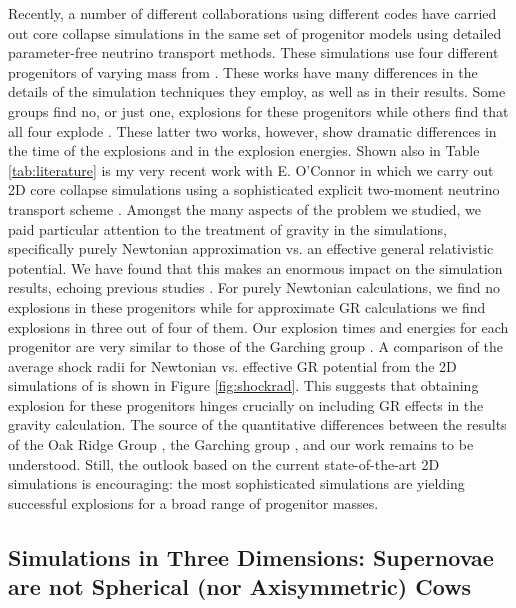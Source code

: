 Recently, a number of different collaborations using different codes have carried out core collapse simulations in the same set of progenitor models using detailed parameter-free neutrino transport methods.
These simulations use four different progenitors of varying mass from \citet{Woosley:2007d}.
These works have many differences in the details of the simulation techniques they employ, as well as in their results.
Some groups find no, or just one, explosions for these progenitors \citep{Suwa:2014, Dolence:2015} while others find that all four explode \citep{Bruenn:2013, Hanke:2014}.
These latter two works, however, show dramatic differences in the time of the explosions and in the explosion energies.
Shown also in Table \ref{tab:literature} is my very recent work with E. O'Connor in which we carry out 2D core collapse simulations using a sophisticated explicit two-moment neutrino transport scheme \citep[``M1'';][]{OConnor:2015a}.
Amongst the many aspects of the problem we studied, we paid particular attention to the treatment of gravity in the simulations, specifically purely Newtonian approximation vs. an effective general relativistic potential.
We have found that this makes an enormous impact on the simulation results, echoing previous studies \citep{Liebendorfer:2001, Rampp:2002, Muller:2012a, Lentz:2012}.
For purely Newtonian calculations, we find no explosions in these progenitors while for approximate GR calculations we find explosions in three out of four of them.
Our explosion times and energies for each progenitor are very similar to those of the Garching group \citep{Hanke:2014}.
A comparison of the average shock radii for Newtonian vs. effective GR potential from the 2D simulations of \citet{OConnor:2015a} is shown in Figure \ref{fig:shockrad}.
This suggests that obtaining explosion for these progenitors hinges crucially on including GR effects in the gravity calculation.
The source of the quantitative differences between the results of the Oak Ridge Group \citep{Bruenn:2013, Bruenn:2014}, the Garching group \citep{Hanke:2014}, and our work \citep{OConnor:2015a} remains to be understood.
Still, the outlook based on the current state-of-the-art 2D simulations is encouraging: the most sophisticated simulations are yielding successful explosions for a broad range of progenitor masses.
\citet{Summa:2016}

\subsection{Simulations in Three Dimensions: Supernovae are not Spherical (nor Axisymmetric) Cows}

